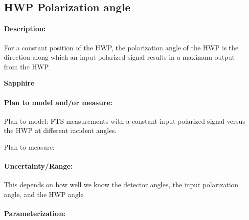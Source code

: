 \subsection{HWP Polarization angle}

\paragraph{Description:}
For a constant position of the HWP, the polarization angle of the HWP is the 
          direction along which an input polarized signal results in a maximum output from the 
          HWP.

\textbf{Sapphire}

\paragraph{Plan to model and/or measure:}
Plan to model: FTS measurements with a constant input polarized signal versus 
          the HWP at different incident angles.

Plan to measure:


\paragraph{Uncertainty/Range:} This depends on
          how well we know the detector angles,
          the input polarization angle, and the
          HWP angle

\paragraph{Parameterization:}




 
